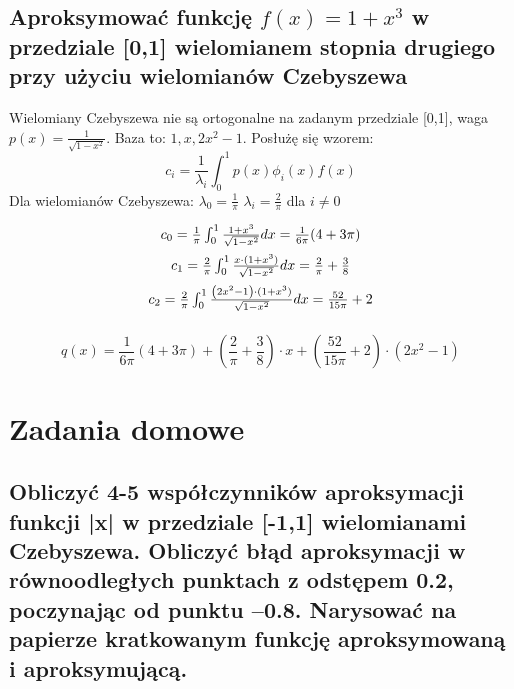 \documentclass[5]{article}
\begin{document}
\subsection{Aproksymować funkcję $f(x)=1+x^{3}$ w przedziale [0,1] wielomianem stopnia drugiego przy użyciu wielomianów Czebyszewa}

Wielomiany Czebyszewa nie są ortogonalne na zadanym przedziale [0,1], waga $p(x)=\frac{1}{\sqrt{1-x^{2}}}$. Baza to: $1, x, 2 x^{2}-1$. Posłużę się wzorem:
$$
c_{i}=\frac{1}{\lambda_{i}} \int_{0}^{1} p(x) \phi_{i}(x) f(x)
$$
Dla wielomianów Czebyszewa:
$\lambda_{0}=\frac{1}{\pi}$
$\lambda_{i}=\frac{2}{\pi}$ dla $i \neq 0$

$$
\begin{array}{c}\vspace{2mm}
c_{0}=\frac{1}{\pi} \int_{0}^{1} \frac{1+x^{3}}{\sqrt{1-x^{2}}} d x=\frac{1}{6 \pi}(4+3 \pi) \\\vspace{2mm}
c_{1}=\frac{2}{\pi} \int_{0}^{1} \frac{x \cdot(1+x^{3})}{\sqrt{1-x^{2}}} d x=\frac{2}{\pi}+\frac{3}{8} \\\vspace{2mm}
c_{2}=\frac{2}{\pi} \int_{0}^{1} \frac{\left(2 x^{2}-1\right) \cdot(1+x^{3})}{\sqrt{1-x^{2}}} d x=\frac{52}{15 \pi}+2
\end{array}
$$


$$
q(x)=\frac{1}{6 \pi}(4+3 \pi)+(\frac{2}{\pi}+\frac{3}{8}) \cdot x+(\frac{52}{15 \pi}+2) \cdot (2 x^{2}-1)
$$


\section{Zadania domowe}

\subsection{Obliczyć 4-5 współczynników aproksymacji funkcji |x| w przedziale [-1,1] wielomianami Czebyszewa. Obliczyć błąd aproksymacji w równoodległych punktach z odstępem 0.2, poczynając od punktu –0.8. Narysować na papierze kratkowanym funkcję aproksymowaną i aproksymującą.}
\end{document}
